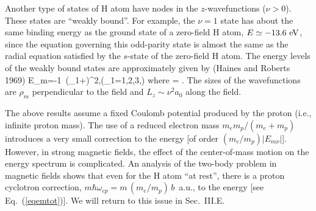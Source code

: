 Another type of states of H atom have nodes in the $z$-wavefunctions 
($\nu>0$). These states are ``weakly bound''. For example, 
the $\nu =1$ state has about the same binding energy as the ground state 
of a zero-field H atom, $E \simeq -13.6 ~{\rm eV}$, since the equation 
governing this odd-parity state is almost the same
as the radial equation satisfied by the $s$-state of the zero-field
H atom. The energy levels of the weakly bound states 
are approximately given by (Haines and Roberts 1969)
\be
E_{m\nu}=-{1\, (\nu_1+\delta)^2},\qquad (\nu_1=1,2,3,\cdots)
\label{eqmnu1}\ee
where 
\be
\delta=
\label{eqmnu2}.
The sizes of the wavefunctions are $\rho_m$
perpendicular to the field and $L_z\sim \nu^2a_0$ along the field. 

The above results assume a fixed Coulomb potential produced by the proton
(i.e., infinite proton mass). The use of a reduced electron mass
$m_em_p/(m_e+m_p)$ introduces a very small correction
to the energy [of order $(m_e/m_p)|E_{m\nu}|$]. 
However, in strong magnetic fields, the effect of the center-of-mass motion 
on the energy spectrum is complicated. An analysis of the two-body problem in
magnetic fields shows that even for the H atom ``at rest'', there is a 
proton cyclotron correction, $m\hbar\omega_{cp}=m\,(m_e/m_p)\,b$~a.u., 
to the energy [see Eq.~(\ref{eqemtot})]. We will return to this issue in
Sec.~III.E.


